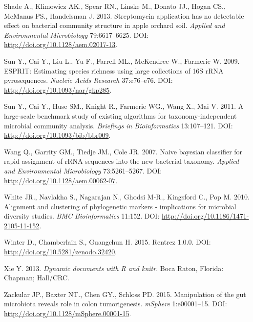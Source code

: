 \documentclass[11pt,]{article}
\begin{document}
Shade A., Klimowicz AK., Spear RN., Linske M., Donato JJ., Hogan CS.,
McManus PS., Handelsman J. 2013. Streptomycin application has no
detectable effect on bacterial community structure in apple orchard
soil. \emph{Applied and Environmental Microbiology} 79:6617--6625. DOI:
\url{http://doi.org/10.1128/aem.02017-13}.

Sun Y., Cai Y., Liu L., Yu F., Farrell ML., McKendree W., Farmerie W.
2009. ESPRIT: Estimating species richness using large collections of 16S
rRNA pyrosequences. \emph{Nucleic Acids Research} 37:e76--e76. DOI:
\url{http://doi.org/10.1093/nar/gkp285}.

Sun Y., Cai Y., Huse SM., Knight R., Farmerie WG., Wang X., Mai V. 2011.
A large-scale benchmark study of existing algorithms for
taxonomy-independent microbial community analysis. \emph{Briefings in
Bioinformatics} 13:107--121. DOI:
\url{http://doi.org/10.1093/bib/bbr009}.

Wang Q., Garrity GM., Tiedje JM., Cole JR. 2007. Naive bayesian
classifier for rapid assignment of rRNA sequences into the new bacterial
taxonomy. \emph{Applied and Environmental Microbiology} 73:5261--5267.
DOI: \url{http://doi.org/10.1128/aem.00062-07}.

White JR., Navlakha S., Nagarajan N., Ghodsi M-R., Kingsford C., Pop M.
2010. Alignment and clustering of phylogenetic markers - implications
for microbial diversity studies. \emph{BMC Bioinformatics} 11:152. DOI:
\url{http://doi.org/10.1186/1471-2105-11-152}.

Winter D., Chamberlain S., Guangchun H. 2015. Rentrez 1.0.0. DOI:
\url{http://doi.org/10.5281/zenodo.32420}.

Xie Y. 2013. \emph{Dynamic documents with R and knitr}. Boca Raton,
Florida: Chapman; Hall/CRC.

Zackular JP., Baxter NT., Chen GY., Schloss PD. 2015. Manipulation of
the gut microbiota reveals role in colon tumorigenesis. \emph{mSphere}
1:e00001--15. DOI: \url{http://doi.org/10.1128/mSphere.00001-15}.
\end{document}
